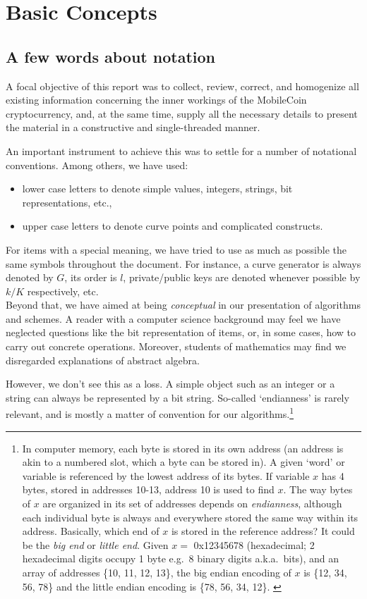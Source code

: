 \chapter{Basic Concepts}
\label{chapter:basicConcepts}



\section{A few words about notation}

A focal objective of this report was to collect, review, correct, and homogenize all existing information concerning the inner workings of the MobileCoin cryptocurrency, and, at the same time, supply all the necessary details to present the material in a constructive and single-threaded manner.

An important instrument to achieve this was to settle for a number of notational conventions. Among others, we have used:

\begin{itemize}
    \item lower case letters to denote simple values, integers, strings, bit representations, etc.,
    \item upper case letters to denote curve points and complicated constructs.
\end{itemize}

For items with a special meaning, we have tried to use as much as possible the same symbols throughout the document. For instance, a curve generator is always denoted by \(G\), its order is \(l\), private/public keys are denoted whenever possible by \(k/K\) respectively, etc.
\\

Beyond that, we have aimed at being {\em conceptual} in our presentation of algorithms and schemes. A reader with a computer science background may feel we have neglected questions like the bit representation of items, or, in some cases, how to carry out concrete operations. Moreover, students of mathematics may find we disregarded explanations of abstract algebra.

However, we don’t see this as a loss. A simple object such as an integer or a string can always be represented by a bit string. So-called `endianness' is rarely relevant, and is mostly a matter of convention for our algorithms.\footnote{In computer memory, each byte is stored in its own address (an address is akin to a numbered slot, which a byte can be stored in). A given `word' or variable is referenced by the lowest address of its bytes. If variable $x$ has 4 bytes, stored in addresses 10-13, address 10 is used to find $x$. The way bytes of $x$ are organized in its set of addresses depends on {\em endianness}, although each individual byte is always and everywhere stored the same way within its address. Basically, which end of $x$ is stored in the reference address? It could be the {\em big end} or {\em little end}. Given $x = $ 0x12345678 (hexadecimal; 2 hexadecimal digits occupy 1 byte e.g.\ 8 binary digits a.k.a.\ bits), and an array of addresses \{10, 11, 12, 13\}, the big endian encoding of $x$ is \{12, 34, 56, 78\} and the little endian encoding is \{78, 56, 34, 12\}. \cite{endianness}}

